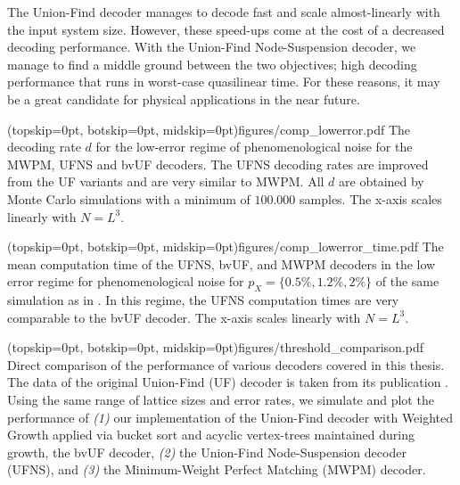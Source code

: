 The Union-Find decoder manages to decode fast and scale almost-linearly with the input system size. However, these speed-ups come at the cost of a decreased decoding performance. With the Union-Find Node-Suspension decoder, we manage to find a middle ground between the two objectives; high decoding performance that runs in worst-case quasilinear time. For these reasons, it may be a great candidate for physical applications in the near future.

\Figure[b!](topskip=0pt, botskip=0pt, midskip=0pt){figures/comp_lowerror.pdf}{
  The decoding rate $d$ for the low-error regime of phenomenological noise for the MWPM, UFNS and bvUF decoders. The UFNS decoding rates are improved from the UF variants and are very similar to MWPM. All $d$ are obtained by Monte Carlo simulations with a minimum of $100.000$ samples. The x-axis scales linearly with $N = L^3$.\label{comp_lowerror}}

\Figure[b!](topskip=0pt, botskip=0pt, midskip=0pt){figures/comp_lowerror_time.pdf}{
  The mean computation time of the UFNS, bvUF, and MWPM decoders in the low error regime for phenomenological noise for $p_X = \{0.5\%, 1.2\%, 2\%\}$ of the same simulation as in . In this regime, the UFNS computation times are very comparable to the bvUF decoder. The x-axis scales linearly with $N = L^3$. \label{comp_lowerror_time}}


\Figure[htb](topskip=0pt, botskip=0pt, midskip=0pt){figures/threshold_comparison.pdf}{
  Direct comparison of the performance of various decoders covered in this thesis. The data of the original Union-Find (UF) decoder is taken from its publication \cite{delfosse2017almost}. Using the same range of lattice sizes and error rates, we simulate and plot the performance of \emph{(1)} our implementation of the Union-Find decoder with Weighted Growth applied via bucket sort and acyclic vertex-trees maintained during growth, the bvUF decoder, \emph{(2)} the Union-Find Node-Suspension decoder (UFNS), and  \emph{(3)} the Minimum-Weight Perfect Matching (MWPM) decoder.\label{thres_comp}}